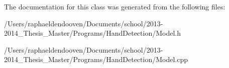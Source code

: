 The documentation for this class was generated from the following files\-:\begin{DoxyCompactItemize}
\item 
/\-Users/raphaeldendooven/\-Documents/school/2013-\/2014\-\_\-\-Thesis\-\_\-\-Master/\-Programs/\-Hand\-Detection/Model.\-h\item 
/\-Users/raphaeldendooven/\-Documents/school/2013-\/2014\-\_\-\-Thesis\-\_\-\-Master/\-Programs/\-Hand\-Detection/Model.\-cpp\end{DoxyCompactItemize}
